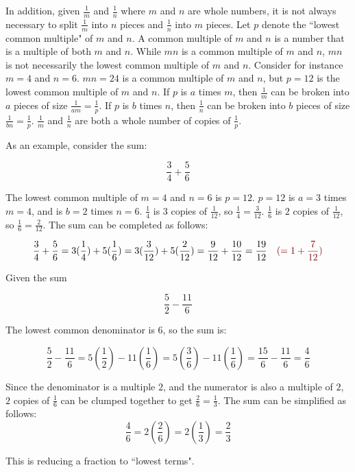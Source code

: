 \documentclass{article}
\newcommand{\dr}[1]{\textcolor{dark_red}{#1}}
\begin{document}
In addition, given \(\frac{1}{m}\) and \(\frac{1}{n}\) where \(m\) and \(n\) are whole numbers, it is not always necessary to split \(\frac{1}{m}\) into \(n\) pieces and \(\frac{1}{n}\) into \(m\) pieces. Let \(p\) denote the ``lowest common multiple" of \(m\) and \(n\). A common multiple of \(m\) and \(n\) is a number that is a multiple of both \(m\) and \(n\). While \(mn\) is a common multiple of \(m\) and \(n\), \(mn\) is not necessarily the lowest common multiple of \(m\) and \(n\). Consider for instance \(m = 4\) and \(n = 6\). \(mn = 24\) is a common multiple of \(m\) and \(n\), but \(p = 12\) is the lowest common multiple of \(m\) and \(n\). If \(p\) is \(a\) times \(m\), then \(\frac{1}{m}\) can be broken into \(a\) pieces of size \(\frac{1}{am} = \frac{1}{p}\). If \(p\) is \(b\) times \(n\), then \(\frac{1}{n}\) can be broken into \(b\) pieces of size \(\frac{1}{bn} = \frac{1}{p}\). \(\frac{1}{m}\) and \(\frac{1}{n}\) are both a whole number of copies of \(\frac{1}{p}\). 

As an example, consider the sum:

\[\frac{3}{4} + \frac{5}{6}\]

The lowest common multiple of \(m = 4\) and \(n = 6\) is \(p = 12\). \(p = 12\) is \(a = 3\) times \(m = 4\), and is \(b = 2\) times \(n = 6\). \(\frac{1}{4}\) is \(3\) copies of \(\frac{1}{12}\), so \(\frac{1}{4} = \frac{3}{12}\). \(\frac{1}{6}\) is \(2\) copies of \(\frac{1}{12}\), so \(\frac{1}{6} = \frac{2}{12}\). The sum can be completed as follows: 

\[\frac{3}{4} + \frac{5}{6} = 3(\frac{1}{4}) + 5(\frac{1}{6}) = 3(\frac{3}{12}) + 5(\frac{2}{12}) = \frac{9}{12} + \frac{10}{12} = \frac{19}{12} \quad \dr{( = 1 + \frac{7}{12})}\]


Given the sum 

\[\frac{5}{2} - \frac{11}{6}\]

The lowest common denominator is \(6\), so the sum is:

\[\frac{5}{2} - \frac{11}{6} = 5(\frac{1}{2}) - 11(\frac{1}{6}) = 5(\frac{3}{6}) - 11(\frac{1}{6}) = \frac{15}{6} - \frac{11}{6} = \frac{4}{6}\]

Since the denominator is a multiple \(2\), and the numerator is also a multiple of \(2\), \(2\) copies of \(\frac{1}{6}\) can be clumped together to get \(\frac{2}{6} = \frac{1}{3}\). The sum can be simplified as follows:
\[\frac{4}{6} = 2(\frac{2}{6}) = 2(\frac{1}{3}) = \frac{2}{3}\]

This is reducing a fraction to ``lowest terms".
\end{document}
